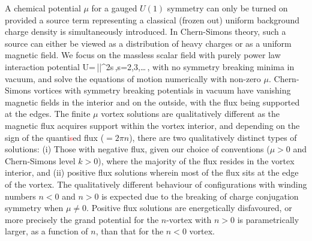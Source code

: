 A chemical potential $\mu$ for a gauged $U(1)$ symmetry  can only be turned on provided a source term representing a classical (frozen out) uniform background charge density is simultaneously introduced. In Chern-Simons theory, such a source can either be viewed as a distribution of heavy charges or as a uniform magnetic field. We focus on the massless scalar field with purely power law interaction potential
\be 
U=\,|\Phi|^{2s}\,,\qquad s=2,3,\ldots\,, \label{powerlawu}
\ee
 with no symmetry breaking minima in vacuum, and solve the equations of motion numerically  with non-zero $\mu$.  Chern-Simons vortices with symmetry breaking potentials in vacuum have vanishing magnetic fields in the interior and on the outside, with the flux being supported at the edges. The finite $\mu$ vortex solutions are qualitatively different as the magnetic flux acquires support within the vortex interior, and depending on the sign of the quanti\textcolor{red}{s}ed flux ($=2\pi n$), there are two qualitatively distinct types of solutions: (i) Those with negative flux, given our choice of conventions ($\mu>0$ and Chern-Simons level $k>0$), where the majority of the flux resides in the vortex interior, and (ii) positive flux solutions wherein most of the flux sits at the edge of the vortex. The qualitatively different behaviour of configurations with winding numbers $n<0$ and $n>0$ is expected due to the breaking of charge conjugation symmetry when $\mu\neq 0$.  Positive flux solutions are energetically disfavoured, or more precisely the grand potential for the $n$-vortex with $n>0$ is parametrically larger, as a function of $n$, than that for the $n<0$ vortex. 
 
